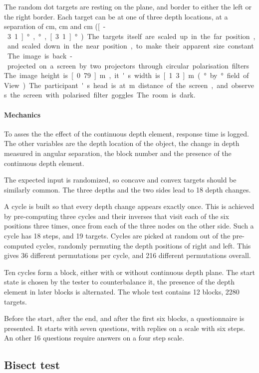 The random dot targets are resting on the plane, and border to either the left or the right border.
Each target can be at  one of three depth locations, at a separation of \unit[6]{cm}, \unit[0]{cm} and \unit[-6]{cm} (\unit[-3.1]{°}, \unit[0]{°}, \unit[3.1]{°}).
The targets itself are scaled up in the far position, and scaled down in the near position, to make their apparent size constant.

The image is back-projected on a screen by two projectors through circular polarisation filters.
The image height is \unit[0.79]{m}, it's width is \unit[1.3]{m} (\unit[36]{°} by \unit[22]{°} field of View).
The participant's head is at \unit[2]{m} distance of the screen, and observes the screen with polarised filter goggles. The room is dark.

\paragraph{Mechanics}
To asses the the effect of the continuous depth element, response time is logged.
The other variables are the depth location of the object, the change in depth measured in angular separation, the block number and the presence of the continuous depth element.

The expected input is randomized, so concave and convex targets should be similarly common.
The three depths and the two sides lead to 18 depth changes.

A cycle is built so that every depth change appears exactly once.
This is achieved by pre-computing three cycles and their inverses that visit each of the six positions three times, once from each of the three nodes on the other side.
Such a cycle has 18 steps, and 19 targets.
Cycles are picked at random out of the pre-computed cycles, randomly permuting the depth positions of right and left.
This gives 36 different permutations per cycle, and 216 different permutations overall.

Ten cycles form a block, either with or without continuous depth plane.
The start state is chosen by the tester to counterbalance it, the presence of the depth element in later blocks is alternated.
The whole test contains 12 blocks, 2280 targets.

Before the start, after the end, and after the first six blocks, a questionnaire is presented.
It starts with seven questions, with replies on a scale with six steps.
An other 16 questions require answers on a four step scale.


\subsection{Bisect test}
